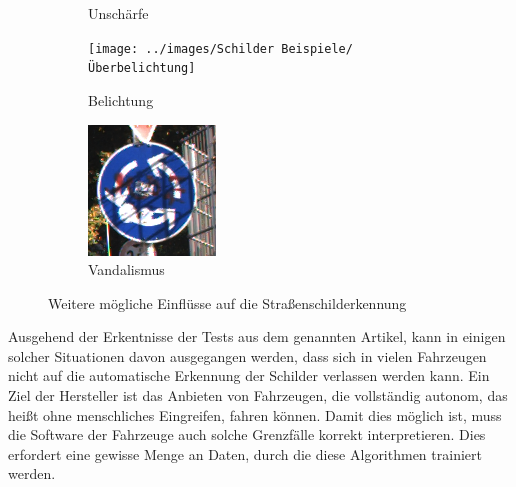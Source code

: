 \begin{figure}[H]
\begin{subfigure}[b]{0.125\textwidth}
       \caption{Unschärfe}
       \label{fig:motion-blur}
   \end{subfigure}
   \hspace{3em}%
   \begin{subfigure}[b]{0.125\textwidth}
       \centering
       \texttt{[image: ../images/Schilder Beispiele/Überbelichtung]}
       \caption{Belichtung}
       \label{fig:ueberbelichtung}
   \end{subfigure}
   \hspace{3em}%
   \begin{subfigure}[b]{0.125\textwidth}
    \centering
    \includegraphics[height=\textwidth]{../images/Schilder Beispiele/Vandalismus.png}
    \caption{Vandalismus}
    \label{fig:vandalism}
   \end{subfigure}
      \caption{Weitere mögliche Einflüsse auf die Straßenschilderkennung}
      \label{fig:einfluesse-strscherkennung2}
\end{figure}

Ausgehend der Erkentnisse der Tests aus dem genannten Artikel, kann in einigen solcher Situationen davon ausgegangen werden, dass sich in vielen Fahrzeugen nicht auf die automatische Erkennung der Schilder verlassen werden kann. Ein Ziel der Hersteller ist das Anbieten von Fahrzeugen, die vollständig autonom, das heißt ohne menschliches Eingreifen, fahren können. Damit dies möglich ist, muss die Software der Fahrzeuge auch solche Grenzfälle korrekt interpretieren. Dies erfordert eine gewisse Menge an Daten, durch die diese Algorithmen trainiert werden.

